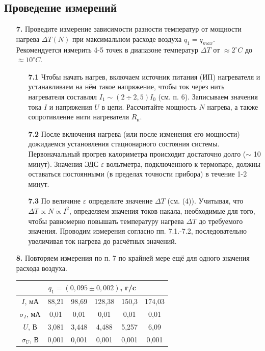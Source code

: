 \documentclass[a4paper, 12pt]{article}%
\begin{document}
\subsection*{Проведение измерений}
\begin{enumerate}
\item [\textbf{7.}]Проведите измерение зависимости разности температур от мощности нагрева $\Delta T (N)$ при максимальном расходе воздуха $q_1 = q_{max}$. Рекомендуется измерить 4-5 точек в диапазоне температур $\Delta T$ от $\approx 2^{\circ}C$ до $\approx 10^{\circ}C$.
\begin{enumerate}
\item [\textbf{7.1}] Чтобы начать нагрев, включаем источник питания (ИП) нагревателя и устанавливаем на нём такое напряжение, чтобы ток через нить нагревателя составлял $I_1 \sim (2 \div 2,5)I_0$ (см. п. 6). Записываем значения тока $I$ и напряжения $U$ в цепи. Рассчитайте мощность $N$ нагрева, а также сопротивление нити нагревателя $R_{\text{н}}$.
\item [\textbf{7.2}] После включения нагрева (или после изменения его мощности) дожидаемся установления стационарного состояния системы. Первоначальный прогрев калориметра происходит достаточно долго ($\sim$ 10 минут). Значения ЭДС $\varepsilon$ вольтметра, подключенного к термопаре, должны оставаться постоянными (в пределах точности прибора) в течение 1-2 минут.
\item [\textbf{7.3}] По величине $\varepsilon$ определите значение $\Delta T$ (см. (4)). Учитывая, что $\Delta T \varpropto N \varpropto I^2$, определяем значения токов накала, необходимые для того, чтобы равномерно повышать температуру нагрева $\Delta T$ до требуемого значения. Проводим измерения согласно пп. 7.1.-7.2, последовательно увеличивая ток нагрева до расчётных значений.
\end{enumerate}
\item [\textbf{8.}] Повторяем измерения по п. 7 по крайней мере ещё для одного значения расхода воздуха.
\begin{center}
\begin{tabular}{|c|c|c|c|c|c|}
\hline
\multicolumn{6}{|c|}{$q_1 = (0,095 \pm0,002)$, г/c} \\ \hline
$I$, мА & 88,21 & 98,69 & 128,38 & 150,3 & 174,03 \\ \hline
$\sigma_I$, мА & 0,01 & 0,01 & 0,01 & 0,01 & 0,01 \\ \hline
$U$, В & 3,081 & 3,448 & 4,488 & 5,257 & 6,09 \\ \hline
$\sigma_U$, В & 0,001 & 0,001 & 0,001 & 0,001 & 0,001 \\ \hline

\end{tabular}
\end{center}
\end{enumerate}
\end{document}
